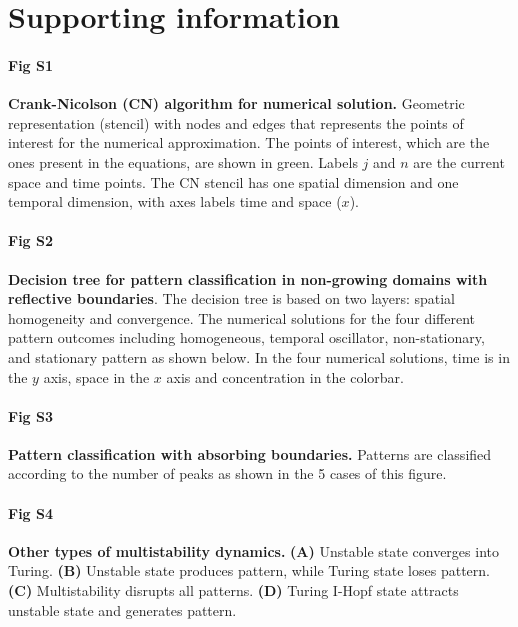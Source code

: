 \documentclass[10pt,letterpaper]{article}
\begin{document}
\linenumbers







\section*{Supporting information}
%
\paragraph*{Fig S1}
\label{S1_Fig}
{\bf Crank-Nicolson (CN) algorithm for numerical solution.}  Geometric representation (stencil) with nodes and edges that represents the points of interest for the numerical approximation. The points of interest, which are the ones present in the equations, are shown in green. Labels $j$ and $n$ are the current space and time points. The CN stencil has one spatial dimension and one temporal dimension, with axes labels time and space ($x$).


    
\paragraph*{Fig S2}
\label{sup_fig2}
{\bf Decision tree for pattern classification in non-growing domains with reflective boundaries}. The decision tree is based on two layers: spatial homogeneity and convergence. The numerical solutions for the four different pattern outcomes including  homogeneous, temporal oscillator, non-stationary, and stationary pattern as shown below. In the four numerical solutions, time is in the $y$ axis, space in the $x$ axis and concentration in the colorbar.

\paragraph*{Fig S3}
\label{sup_fig3}
{\bf Pattern classification with absorbing boundaries.} Patterns are classified according to the number of peaks as shown in the 5 cases of this figure.  %


\paragraph*{Fig S4}
\label{sup_fig4}
{\bf Other types of multistability dynamics.} \textbf{(A)} Unstable state converges into Turing. \textbf{(B)} Unstable state produces pattern, while Turing state loses pattern. \textbf{(C)} Multistability disrupts all patterns. \textbf{(D)} Turing I-Hopf state attracts unstable state and generates pattern.
\end{document}

